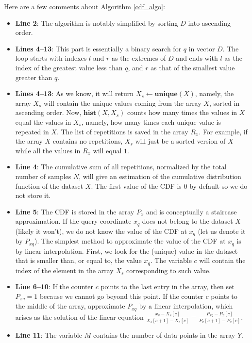 \documentclass[10pt,final]{siamltex}
\begin{document}
Here are a few comments about Algorithm \ref{cdf_algo}:
\begin{itemize}
  \item \textbf{Line 2}: The algorithm is notably simplified by sorting $D$ into ascending order.
  \item \textbf{Lines 4--13}: This part is essentially a binary search for $q$ in vector $D$. The loop starts with indexes $l$ and $r$ as the extremes of $D$ and ends with $l$ as the index of the greatest value less than $q$, and $r$ as that of the smallest value greater than $q$.
  \item \textbf{Lines 4--13}: As we know, it will return $X_s \gets \mathbf{unique}(X)$, namely, the array $X_s$ will contain the unique values coming from the array $X$, sorted in ascending order. Now, $\mathbf{hist}(X,X_s)$ counts how many times the values in $X$ equal the values in $X_s$, namely, how many times each unique value is repeated in $X$. The list of repetitions is saved in the array $R_x$. For example, if the array $X$ contains no repetitions, $X_s$ will just be a sorted version of $X$ while all the values in $R_x$ will equal $1$.
  \item \textbf{Line 4}: The cumulative sum of all repetitions, normalized by the total number of samples $N$, will give an estimation of the cumulative distribution function of the dataset $X$. The first value of the CDF is $0$ by default so we do not store it.
  \item \textbf{Line 5}: The CDF is stored in the array $P_x$ and is conceptually a staircase approximation. If the query coordinate $x_q$ does not belong to the dataset $X$ (likely it won't), we do not know the value of the CDF at $x_q$ (let us denote it by $P_{xq}$). The simplest method to approximate the value of the CDF at $x_q$ is by linear interpolation. First, we look for the (unique) value in the dataset that is smaller than, or equal to, the value $x_q$. The variable $c$ will contain the index of the element in the array $X_s$ corresponding to such value.
  \item \textbf{Line 6--10}: If the counter $c$ points to the last entry in the array, then set $P_{xq}=1$ because we cannot go beyond this point. If the counter $c$ points to the middle of the array, approximate $P_{xq}$ by a linear interpolation, which arises as the solution of the linear equation $\tfrac{x_q-X_s[c]}{X_s[c+1]-X_s[c]}=\tfrac{P_{xq}-P_x[c]}{P_x[c+1]-P_x[c]}$.
  \item \textbf{Line 11}: The variable $M$ contains the number of data-points in the array $Y$.

\end{itemize}
\end{document}
